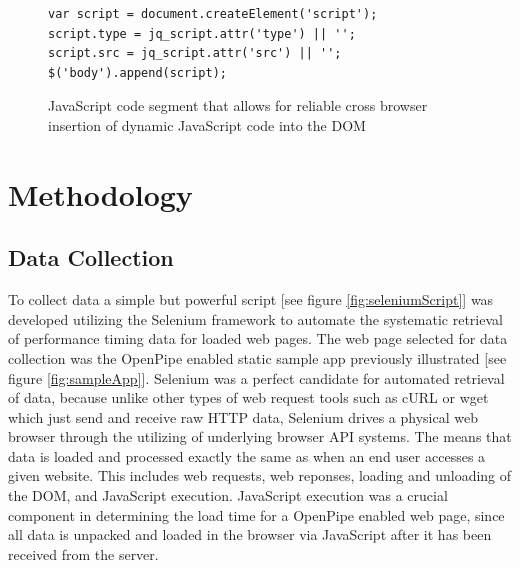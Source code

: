 \documentclass[12pt]{report}
\begin{document}
\begin{figure}[H]
\label{fig:javascriptInsertion}
\begin{lstlisting}
var script = document.createElement('script');
script.type = jq_script.attr('type') || '';
script.src = jq_script.attr('src') || '';
$('body').append(script);
\end{lstlisting}
\caption{JavaScript code segment that allows for reliable cross browser insertion of dynamic JavaScript code into the DOM}
\end{figure}

\chapter{Methodology}

\section{Data Collection}

To collect data a simple but powerful script [see figure \ref{fig:seleniumScript}] was developed utilizing the Selenium framework to automate the systematic retrieval of performance timing data for loaded web pages. The web page selected for data collection was the OpenPipe enabled static sample app previously illustrated [see figure \ref{fig:sampleApp}].  Selenium was a perfect candidate for automated retrieval of data, because unlike other types of web request tools such as cURL or wget which just send and receive raw HTTP data, Selenium drives a physical web browser through the utilizing of underlying browser API systems. The means that data is loaded and processed exactly the same as when an end user accesses a given website. This includes web requests, web reponses,  loading and unloading of the DOM,  and JavaScript execution. JavaScript execution was a crucial component in determining the load time for a OpenPipe enabled web page, since all data is unpacked and loaded in the browser via JavaScript after it has been received from the server.
\end{document}
